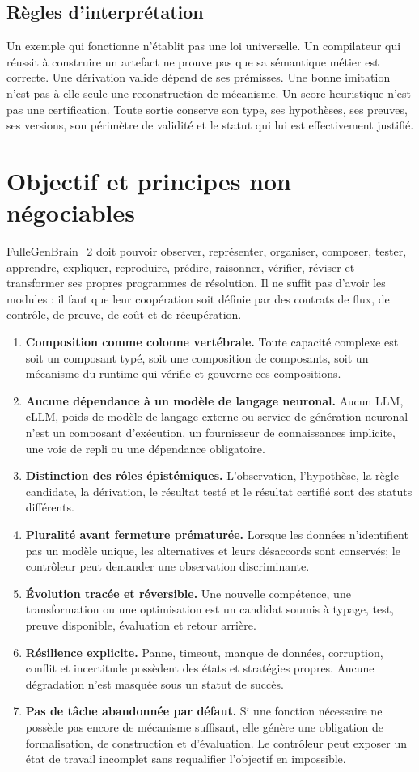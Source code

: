 \documentclass[11pt,a4paper]{article}
\begin{document}
\subsection{Règles d'interprétation}
Un exemple qui fonctionne n'établit pas une loi universelle. Un compilateur qui réussit à construire un artefact ne prouve pas que sa sémantique métier est correcte. Une dérivation valide dépend de ses prémisses. Une bonne imitation n'est pas à elle seule une reconstruction de mécanisme. Un score heuristique n'est pas une certification. Toute sortie conserve son type, ses hypothèses, ses preuves, ses versions, son périmètre de validité et le statut qui lui est effectivement justifié.

\section{Objectif et principes non négociables}
FulleGenBrain\_2 doit pouvoir observer, représenter, organiser, composer, tester, apprendre, expliquer, reproduire, prédire, raisonner, vérifier, réviser et transformer ses propres programmes de résolution. Il ne suffit pas d'avoir les modules : il faut que leur coopération soit définie par des contrats de flux, de contrôle, de preuve, de coût et de récupération.

\begin{enumerate}
\item \textbf{Composition comme colonne vertébrale.} Toute capacité complexe est soit un composant typé, soit une composition de composants, soit un mécanisme du runtime qui vérifie et gouverne ces compositions.
\item \textbf{Aucune dépendance à un modèle de langage neuronal.} Aucun LLM, eLLM, poids de modèle de langage externe ou service de génération neuronal n'est un composant d'exécution, un fournisseur de connaissances implicite, une voie de repli ou une dépendance obligatoire.
\item \textbf{Distinction des rôles épistémiques.} L'observation, l'hypothèse, la règle candidate, la dérivation, le résultat testé et le résultat certifié sont des statuts différents.
\item \textbf{Pluralité avant fermeture prématurée.} Lorsque les données n'identifient pas un modèle unique, les alternatives et leurs désaccords sont conservés; le contrôleur peut demander une observation discriminante.
\item \textbf{Évolution tracée et réversible.} Une nouvelle compétence, une transformation ou une optimisation est un candidat soumis à typage, test, preuve disponible, évaluation et retour arrière.
\item \textbf{Résilience explicite.} Panne, timeout, manque de données, corruption, conflit et incertitude possèdent des états et stratégies propres. Aucune dégradation n'est masquée sous un statut de succès.
\item \textbf{Pas de tâche abandonnée par défaut.} Si une fonction nécessaire ne possède pas encore de mécanisme suffisant, elle génère une obligation de formalisation, de construction et d'évaluation. Le contrôleur peut exposer un état de travail incomplet sans requalifier l'objectif en impossible.
\end{enumerate}
\end{document}
